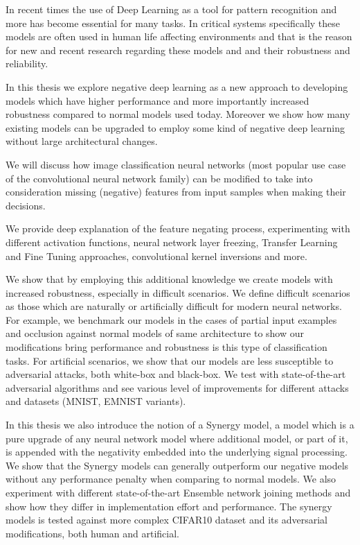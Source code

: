 \documentclass[b5paper]{book}
\begin{document}
In recent times the use of Deep Learning as a tool for pattern recognition and more has become essential for many tasks. In critical systems specifically these models are often used in human life affecting environments and that is the reason for new and recent research regarding these models and and their robustness and reliability. 

In this thesis we explore negative deep learning as a new approach to developing models which have higher performance and more importantly increased robustness compared to normal models used today. Moreover we show how many existing models can be upgraded to employ some kind of negative deep learning without large architectural changes.

We will discuss how image classification neural networks (most popular use case of the convolutional neural network family) can be modified to take into consideration missing (negative) features from input samples when making their decisions. 

We provide deep explanation of the feature negating process, experimenting with different activation functions, neural network layer freezing, Transfer Learning and Fine Tuning approaches, convolutional kernel inversions and more.

We show that by employing this additional knowledge we create models with increased robustness, especially in difficult scenarios. We define difficult scenarios as those which are naturally or artificially difficult for modern neural networks. For example, we benchmark our models in the cases of partial input examples and occlusion against normal models of same architecture to show our modifications bring performance and robustness is this type of classification tasks. For artificial scenarios, we show that our models are less susceptible to adversarial attacks, both white-box and black-box. We test with state-of-the-art adversarial algorithms and see various level of improvements for different attacks and datasets (MNIST, EMNIST variants).

In this thesis we also introduce the notion of a Synergy model, a model which is a pure upgrade of any neural network model where additional model, or part of it, is appended with the negativity embedded into the underlying signal processing. We show that the Synergy models can generally outperform our negative models without any performance penalty when comparing to normal models. We also experiment with different state-of-the-art Ensemble network joining methods and show how they differ in implementation effort and performance. The synergy models is tested against more complex CIFAR10 dataset and its adversarial modifications, both human and artificial.
\end{document}
